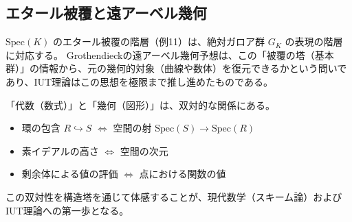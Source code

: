 \documentclass[a4paper,11pt]{ltjsarticle}
\theoremstyle{definition}
\newcommand{\Spec}{\mathrm{Spec}}
\begin{document}
\subsection{エタール被覆と遠アーベル幾何}
$\Spec(K)$ のエタール被覆の階層（例11）は、絶対ガロア群 $G_K$ の表現の階層に対応する。
Grothendieckの遠アーベル幾何予想は、この「被覆の塔（基本群）」の情報から、元の幾何的対象（曲線や数体）を復元できるかという問いであり、IUT理論はこの思想を極限まで推し進めたものである。

\begin{tcolorbox}[colback=green!5!white,colframe=green!75!black,title=学習のポイント]
「代数（数式）」と「幾何（図形）」は、双対的な関係にある。
\begin{itemize}
    \item 環の包含 $R \hookrightarrow S$ $\iff$ 空間の射 $\Spec(S) \to \Spec(R)$
    \item 素イデアルの高さ $\iff$ 空間の次元
    \item 剰余体による値の評価 $\iff$ 点における関数の値
\end{itemize}
この双対性を構造塔を通じて体感することが、現代数学（スキーム論）およびIUT理論への第一歩となる。
\end{tcolorbox}
\end{document}
